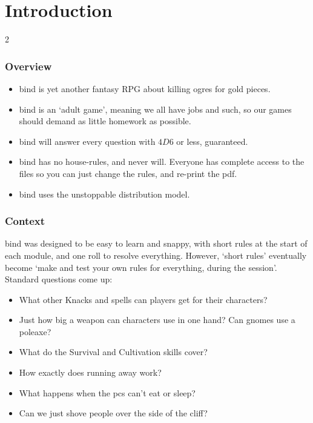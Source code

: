 \chapter*{Introduction}

\begin{multicols}{2}

\subsection*{Overview}

\begin{itemize}
  \item
  \Gls{bind} is yet another fantasy RPG about killing ogres for gold pieces.
  \item
  \Gls{bind} is an `adult game', meaning we all have jobs and such, so our games should demand as little homework as possible.
  \item
  \Gls{bind} will answer every question with $4D6$ or less, guaranteed.
  \item
  \Gls{bind} has no house-rules, and never will.
  Everyone has complete access to the files so you can just change the rules, and re-print the \gls{pdf}.
  \item
  \Gls{bind} uses the unstoppable  distribution model.
\end{itemize}

\subsection*{Context}

\Gls{bind} was designed to be easy to learn and snappy, with short rules at the start of each module, and one roll to resolve everything.
However, `short rules' eventually become `make and test your own rules for everything, during the session'.
Standard questions come up:

\begin{itemize}
  \item
  What other Knacks and \glspl{spell} can players get for their characters?
  \item
  Just how big a weapon can characters use in one hand?
  Can gnomes use a poleaxe?
  \item
  What do the Survival and Cultivation \glspl{skill} cover?
  \item
  How exactly does running away work?
  \item
  What happens when the \glspl{pc} can't eat or sleep?
  \item
  Can we just shove people over the side of the cliff?
\end{itemize}


\end{multicols}
